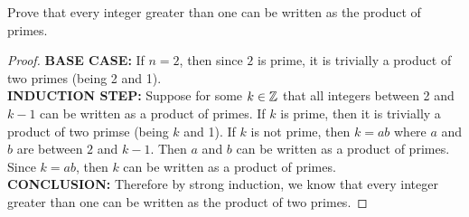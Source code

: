 \begin{problem}
    Prove that every integer greater than one can be written as the product of primes.

    \begin{proof}
        \textbf{BASE CASE:} If $n = 2$, then since $2$ is prime, it is trivially a product of two primes (being 2 and 1).\\

        \textbf{INDUCTION STEP:} Suppose for some $k \in \mathbb{Z}$ that all integers between 2 and $k-1$ can be written as a product of primes. If $k$ is prime, then it is trivially a product of two primse (being $k$ and 1). If $k$ is not prime, then $k = ab$ where $a$ and $b$ are between $2$ and $k-1$. Then $a$ and $b$ can be written as a product of primes. Since $k=ab$, then $k$ can be written as a product of primes. \\

        \textbf{CONCLUSION:} Therefore by strong induction, we know that every integer greater than one can be written as the product of two primes.
    \end{proof}
\end{problem}